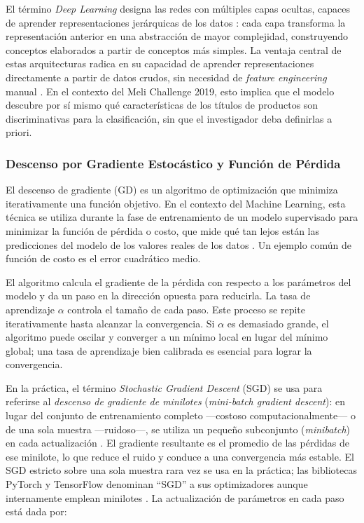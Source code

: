 \documentclass[11pt,a4paper]{article}
\begin{document}
El término \emph{Deep Learning} designa las redes con múltiples capas ocultas, capaces de aprender representaciones jerárquicas de los datos \cite{goodfellow2016}: cada capa transforma la representación anterior en una abstracción de mayor complejidad, construyendo conceptos elaborados a partir de conceptos más simples. La ventaja central de estas arquitecturas radica en su capacidad de aprender representaciones directamente a partir de datos crudos, sin necesidad de \textit{feature engineering} manual \cite{goodfellow2016}. En el contexto del Meli Challenge 2019, esto implica que el modelo descubre por sí mismo qué características de los títulos de productos son discriminativas para la clasificación, sin que el investigador deba definirlas a priori.

\subsubsection{Descenso por Gradiente Estocástico y Función de Pérdida}
\label{sec:sgd}

El descenso de gradiente (GD) es un algoritmo de optimización que minimiza iterativamente una función objetivo. En el contexto del Machine Learning, esta técnica se utiliza durante la fase de entrenamiento de un modelo supervisado para minimizar la función de pérdida o costo, que mide qué tan lejos están las predicciones del modelo de los valores reales de los datos \cite{goodfellow2016}. Un ejemplo común de función de costo es el error cuadrático medio.

El algoritmo calcula el gradiente de la pérdida con respecto a los parámetros del modelo y da un paso en la dirección opuesta para reducirla. La tasa de aprendizaje $\alpha$ controla el tamaño de cada paso. Este proceso se repite iterativamente hasta alcanzar la convergencia. Si $\alpha$ es demasiado grande, el algoritmo puede oscilar y converger a un mínimo local en lugar del mínimo global; una tasa de aprendizaje bien calibrada es esencial para lograr la convergencia.

En la práctica, el término \emph{Stochastic Gradient Descent} (SGD) se usa para referirse al \emph{descenso de gradiente de minilotes} (\textit{mini-batch gradient descent}): en lugar del conjunto de entrenamiento completo ---costoso computacionalmente--- o de una sola muestra ---ruidoso---, se utiliza un pequeño subconjunto (\textit{minibatch}) en cada actualización \cite{ibm-sgd,goodfellow2016}. El gradiente resultante es el promedio de las pérdidas de ese minilote, lo que reduce el ruido y conduce a una convergencia más estable. El SGD estricto sobre una sola muestra rara vez se usa en la práctica; las bibliotecas PyTorch y TensorFlow denominan ``SGD'' a sus optimizadores aunque internamente emplean minilotes \cite{ibm-sgd}. La actualización de parámetros en cada paso está dada por:
\end{document}
